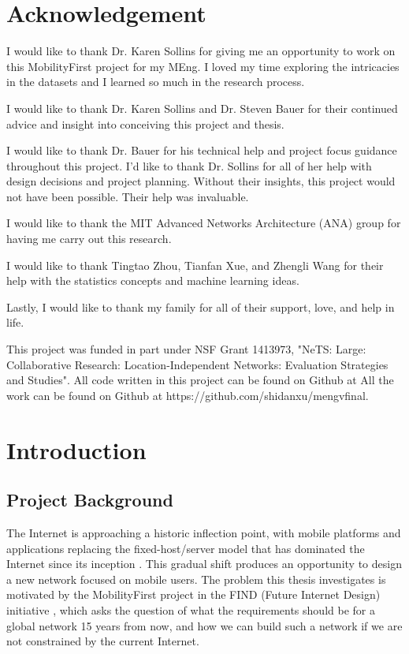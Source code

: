 \documentclass[]{article}
\begin{document}
\newpage


\section*{Acknowledgement}

I would like to thank Dr. Karen Sollins for giving me an opportunity to work on this MobilityFirst project for my MEng. I loved my time exploring the intricacies in the datasets and I learned so much in the research process.

I would like to thank Dr. Karen Sollins and Dr. Steven Bauer for their continued advice and insight into conceiving this project and thesis.

I would like to thank Dr. Bauer for his technical help and project focus guidance throughout this project. I'd like to thank Dr. Sollins for all of her help with design decisions and project planning. Without their insights, this project would not have been possible. Their help was invaluable.

I would like to thank the MIT Advanced Networks Architecture (ANA) group for having me carry out this research.
 
I would like to thank Tingtao Zhou, Tianfan Xue, and Zhengli Wang for their help with the statistics concepts and machine learning ideas.

Lastly, I would like to thank my family for all of their support, love, and help in life. 

This project was funded in part under NSF Grant 1413973, "NeTS: Large: Collaborative Research: Location-Independent Networks: Evaluation Strategies and Studies". All code written in this project can be found on Github at All the work can be found on Github at https://github.com/shidanxu/mengvfinal.


\newpage
\singlespacing
\tableofcontents
\newpage
\listoffigures
\listoftables

\doublespacing
\linespread{2.0}
\selectfont

\newpage

\section{Introduction}

\subsection{Project Background}

The Internet is approaching a historic inflection point, with mobile platforms and applications replacing the fixed-host/server model that has dominated the Internet since its inception \cite{mobilityfirst}. This gradual shift produces an opportunity to design a new network focused on mobile users. The problem this thesis investigates is motivated by the MobilityFirst project in the FIND (Future Internet Design) initiative \cite{find}, which asks the question of what the requirements should be for a global network 15 years from now, and how we can build such a network if we are not constrained by the current Internet. 
\end{document}

